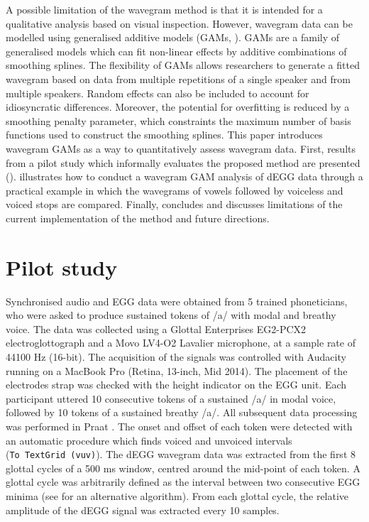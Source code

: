\documentclass[
  11pt,
  a4paper,
]{article}
\begin{document}
A possible limitation of the wavegram method is that it is intended for
a qualitative analysis based on visual inspection. However, wavegram
data can be modelled using generalised additive models (GAMs,
\citealt{hastie1986, zuur2012, wood2017}). GAMs are a family of
generalised models which can fit non-linear effects by additive
combinations of smoothing splines. The flexibility of GAMs allows
researchers to generate a fitted wavegram based on data from multiple
repetitions of a single speaker and from multiple speakers. Random
effects can also be included to account for idiosyncratic differences.
Moreover, the potential for overfitting is reduced by a smoothing
penalty parameter, which constraints the maximum number of basis
functions used to construct the smoothing splines. This paper introduces
wavegram GAMs as a way to quantitatively assess wavegram data. First,
results from a pilot study which informally evaluates the proposed
method are presented ().  illustrates how
to conduct a wavegram GAM analysis of dEGG data through a practical
example in which the wavegrams of vowels followed by voiceless and
voiced stops are compared. Finally,  concludes and
discusses limitations of the current implementation of the method and
future directions.

\hypertarget{pilot-study}{%
\section{Pilot study}\label{pilot-study}}

\label{s:pilot}

Synchronised audio and EGG data were obtained from 5 trained
phoneticians, who were asked to produce sustained tokens of /a/ with
modal and breathy voice. The data was collected using a Glottal
Enterprises EG2-PCX2 electroglottograph and a Movo LV4-O2 Lavalier
microphone, at a sample rate of 44100 Hz (16-bit). The acquisition of
the signals was controlled with Audacity running on a MacBook Pro
(Retina, 13-inch, Mid 2014). The placement of the electrodes strap was
checked with the height indicator on the EGG unit. Each participant
uttered 10 consecutive tokens of a sustained /a/ in modal voice,
followed by 10 tokens of a sustained breathy /a/. All subsequent data
processing was performed in Praat \citep{boersma2018}. The onset and
offset of each token were detected with an automatic procedure which
finds voiced and unvoiced intervals (\texttt{To\ TextGrid\ (vuv)}). The
dEGG wavegram data was extracted from the first 8 glottal cycles of a
500 ms window, centred around the mid-point of each token. A glottal
cycle was arbitrarily defined as the interval between two consecutive
EGG minima (see \citealt{herbst2010} for an alternative algorithm). From
each glottal cycle, the relative amplitude of the dEGG signal was
extracted every 10 samples.
\end{document}
